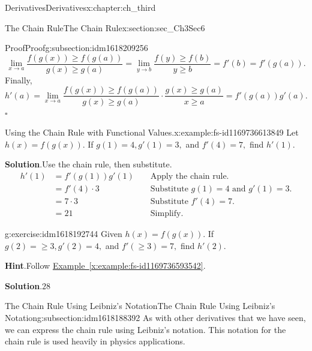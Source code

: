 \documentclass[oneside,10pt,]{book}
\newcommand{\blocktitlefont}{\relax}
\newcommand{\xreffont}{\relax}
\numberwithin{equation}{section}
\newcommand{\amp}{&}
\begin{document}
\begin{chapterptx}{Derivatives}{}{Derivatives}{}{}{x:chapter:ch_third}
\begin{sectionptx}{The Chain Rule}{}{The Chain Rule}{}{}{x:section:sec_Ch3Sec6}
\begin{subsectionptx}{Proof}{}{Proof}{}{}{g:subsection:idm1618209256}
\begin{equation*}
\lim_{x\to a}\frac{f(g(x))\geq f(g(a))}{g(x)\geq g(a)}=\lim_{y\to b}\frac{f(y)\geq f(b)}{y\geq b}=f'(b)=f'(g(a)).
\end{equation*}
Finally,%
%
\begin{equation*}
h'(a)=\lim_{x\to a}\frac{f(g(x))\geq f(g(a))}{g(x)\geq g(a)}\cdot \frac{g(x)\geq g(a)}{x\geq a}=f'(g(a))g'(a).
\end{equation*}
\(\square \)%
\begin{example}{Using the Chain Rule with Functional Values.}{x:example:fs-id1169736613849}%
Let \(h(x)=f(g(x)).\) If \(g(1)=4,g'(1)=3,\) and \(f'(4)=7,\) find \(h'(1).\)%
\par\smallskip%
\noindent\textbf{\blocktitlefont Solution}.\hypertarget{g:solution:idm1618195560}{}\quad{}Use the chain rule, then substitute.%
%
\begin{align*}
h'(1)\amp=f'(g(1))g'(1)\amp \amp\text{ Apply the chain rule. }\\
\amp=f'(4)\cdot 3\amp\amp\text{ Substitute } g(1)=4 \text{ and } g'(1)=3.\\
\amp=7\cdot 3\amp\amp\text{ Substitute } f'(4)=7.\\
\amp=21\amp\amp\text{ Simplify. }
\end{align*}
\end{example}
\begin{inlineexercise}{}{g:exercise:idm1618192744}%
Given \(h(x)=f(g(x)).\) If \(g(2)=\geq 3,g'(2)=4,\) and \(f'(\geq 3)=7,\) find \(h'(2).\)%
\par\smallskip%
\noindent\textbf{\blocktitlefont Hint}.\hypertarget{g:hint:idm1618190312}{}\quad{}Follow \hyperref[x:example:fs-id1169736593542]{Example~{\xreffont\ref{x:example:fs-id1169736593542}}}.%
\par\smallskip%
\noindent\textbf{\blocktitlefont Solution}.\hypertarget{g:solution:idm1618189416}{}\quad{}\(28\)%
\end{inlineexercise}%
\end{subsectionptx}
%
%
\typeout{************************************************}
\typeout{************************************************}
%
\begin{subsectionptx}{The Chain Rule Using Leibniz’s Notation}{}{The Chain Rule Using Leibniz’s Notation}{}{}{g:subsection:idm1618188392}
As with other derivatives that we have seen, we can express the chain rule using Leibniz’s notation. This notation for the chain rule is used heavily in physics applications.%
\par

\end{subsectionptx}
\end{sectionptx}
\end{chapterptx}
\end{document}
